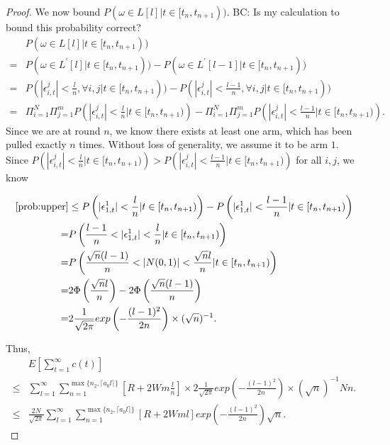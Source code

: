 \documentclass{article}
\newcommand{\bccomment}[1]{{\color{blue}BC: #1}}
\begin{document}
\begin{proof}
We now bound $P(\omega\in L[l]|t\in[t_{n},t_{n+1}))$. \bccomment{Is my calculation to bound this probability correct?}
\begin{align}
&P(\omega\in L[l]|t\in[t_{n},t_{n+1})) \nonumber \\
=&P(\omega\in L^{'}[l]|t\in[t_{n},t_{n+1}))- P(\omega\in L^{'}[l-1]|t\in[t_{n},t_{n+1})) \nonumber \\
=&P(|\epsilon_{i,t}^{j}|<\frac{l}{n}, \forall i,j|t\in[t_n,t_{n+1}))-P(|\epsilon_{i,t}^{j}|<\frac{l-1}{n}, \forall i,j|t\in[t_n,t_{n+1})) \nonumber \\
=&\Pi_{i=1}^{N}\Pi_{j=1}^{m}P\left(|\epsilon_{i,t}^{j}|<\frac{l}{n}|t\in[t_n,t_{n+1})\right)-\Pi_{i=1}^{N}\Pi_{j=1}^{m}P\left(|\epsilon_{i,t}^{j}|<\frac{l-1}{n}|t\in[t_n,t_{n+1})\right). \label{prob:upper}
\end{align}
Since we are at round $n$, we know there exists at least one arm, which has been pulled exactly $n$ times. Without loss of generality, we assume it to be arm $1$. Since $P\left(|\epsilon_{i,t}^{j}|<\frac{l}{n}|t\in[t_n,t_{n+1})\right)> P\left(|\epsilon_{i,t}^{j}|<\frac{l-1}{n}|t\in[t_n,t_{n+1})\right)$ for all $i,j$, we know

\begin{align}
\eqref{prob:upper}&\leq P\left(|\epsilon_{1,t}^{1}|<\frac{l}{n}|t\in[t_n,t_{n+1})\right)-P\left(|\epsilon_{1,t}^{1}|<\frac{l-1}{n}|t\in[t_n,t_{n+1})\right) \nonumber \\
=&P\left(\frac{l-1}{n}<|\epsilon_{1,t}^{1}|<\frac{l}{n}|t\in[t_n,t_{n+1})\right) \nonumber \\
=&P\left(\frac{\sqrt{n}(l-1)}{n}<|N(0,1)|<\frac{\sqrt{n}l}{n}|t\in[t_n,t_{n+1})\right) \nonumber \\
=&2\Phi\left(\frac{\sqrt{n}l}{n}\right)-2\Phi\left(\frac{\sqrt{n}(l-1)}{n}\right) \nonumber \\
=&2 \frac{1}{\sqrt{2\pi}}exp\left(-\frac{(l-1)^2}{2n}\right)\times (\sqrt{n})^{-1}. \nonumber
\end{align}

Thus,
\begin{align}
&E\left[\sum_{t=1}^{\infty}c(t)\right] \nonumber\\
\leq & \sum_{l=1}^{\infty}\sum_{n=1}^{\max\{n_2,\lceil a_0 l\rceil\}}\left[R+2Wm\frac{l}{n}\right]\times 2 \frac{1}{\sqrt{2\pi}}exp\left(-\frac{(l-1)^2}{2n}\right)\times (\sqrt{n})^{-1}Nn. \nonumber \\
\leq & \frac{2N}{\sqrt{2\pi}}\sum_{l=1}^{\infty}\sum_{n=1}^{\max\{n_2,\lceil a_0 l\rceil\}}\left[R+2Wml\right]exp\left(-\frac{(l-1)^2}{2n}\right)\sqrt{n}. \nonumber
\end{align}


\end{proof}
\end{document}
